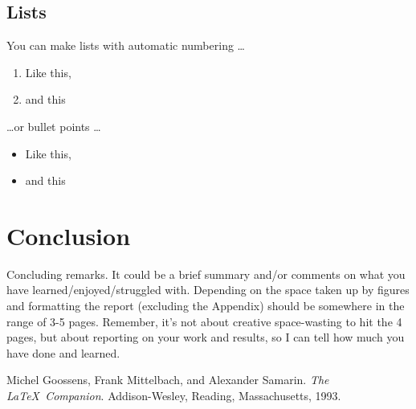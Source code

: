 \documentclass[12pt]{article}
\begin{document}
\subsection{Lists}

You can make lists with automatic numbering \dots

\begin{enumerate}
\item Like this,
\item and this
\end{enumerate}
\dots or bullet points \dots
\begin{itemize}
\item Like this,
\item and this
\end{itemize}

\section{Conclusion}

Concluding remarks.  It could be a brief summary and/or comments on what you have learned/enjoyed/struggled with.      Depending on the space taken up by figures and formatting the report (excluding the Appendix) should be somewhere in the range of 3-5 pages.  Remember, it's not about creative space-wasting to hit the 4 pages, but about reporting on your work and results, so I can tell how much you have done and learned.  





\begin{thebibliography}{3}

Michel Goossens, Frank Mittelbach, and Alexander Samarin. \textit{The \LaTeX\ Companion}. Addison-Wesley, Reading, Massachusetts, 1993.

\end{thebibliography}
\end{document}
